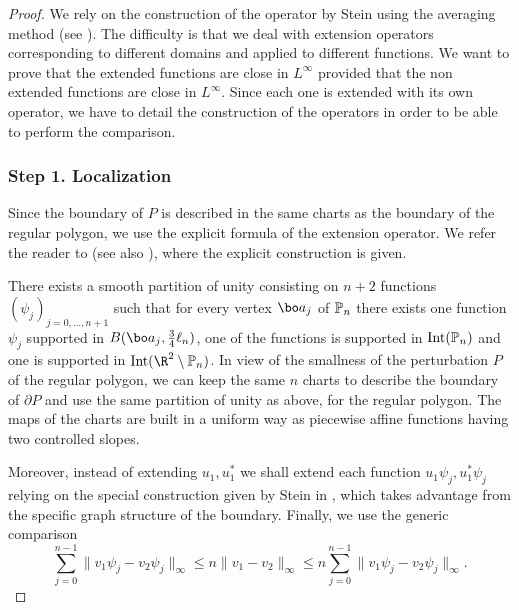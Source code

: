 \begin{proof}

We rely on the construction of the operator by Stein using the averaging method (see \cite[Th.\,5, p.\,181]{St70}). The difficulty is that we deal with extension operators corresponding to different domains and applied to different functions. We want to prove that the extended functions are close in $L^\infty$ provided that the non extended functions are close in $L^\infty$. Since each one is extended with its own operator, we have to detail the construction of the operators in order to be able to perform the comparison.

\subsubsection*{Step 1. Localization}
Since the boundary of $P$ is described in the same charts as the boundary of the regular polygon, we use the explicit formula of the extension operator. We refer the reader to \cite[Th.\,5, p.\,181]{St70} (see also \cite{LaVi19,HLZ12}), where the explicit construction is given.

There exists a smooth partition of unity consisting on $n+2$ functions $(\psi_j)_{j=0, \dots, n+1}$ such that for every vertex $\bo a_j$ of $\Bbb P_n$ there exists one function $\psi_j$ supported in $B(\bo a_j, \frac34 \ell_n)$, one of the functions is supported in $\text{Int}(\Bbb P_n)$ and one is supported in $\text{Int}(\R^2 \setminus \Bbb P_n)$.
In view of the smallness of the perturbation $P$ of the regular polygon, we can keep the same $n$ charts to describe the boundary of $\partial P$ and use the same partition of unity as above, for the regular polygon.
The maps of the charts are built in a uniform way as piecewise affine functions having two controlled slopes.

Moreover, instead of extending $u_1, u_1^*$ we shall extend each function $u_1\psi_j, u_1^*\psi_j$ relying on the special construction given by Stein in \cite[Th.\,5, p.\,181]{St70}, which takes advantage from the specific graph structure of the boundary. Finally, we use the generic comparison
\[
\sum_{j=0}^{n-1} \| v_1\psi_j -v_2\psi_j\|_\infty \le n \| v_1 -v_2 \|_\infty \le n \sum_{j=0}^{n-1} \| v_1\psi_j -v_2\psi_j\|_\infty.
\]


\end{proof}
